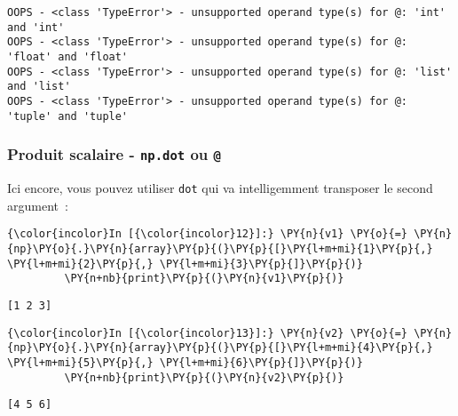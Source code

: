     \begin{Verbatim}[commandchars=\\\{\},frame=single,framerule=0.3mm,rulecolor=\color{cellframecolor}]
OOPS - <class 'TypeError'> - unsupported operand type(s) for @: 'int' and 'int'
OOPS - <class 'TypeError'> - unsupported operand type(s) for @: 'float' and 'float'
OOPS - <class 'TypeError'> - unsupported operand type(s) for @: 'list' and 'list'
OOPS - <class 'TypeError'> - unsupported operand type(s) for @: 'tuple' and 'tuple'
\end{Verbatim}

    \hypertarget{produit-scalaire---np.dot-ou}{%
\subsubsection{\texorpdfstring{Produit scalaire - \texttt{np.dot} ou
\texttt{@}}{Produit scalaire - np.dot ou @}}\label{produit-scalaire---np.dot-ou}}

    Ici encore, vous pouvez utiliser \texttt{dot} qui va intelligemment
transposer le second argument~:

    \begin{Verbatim}[commandchars=\\\{\},frame=single,framerule=0.3mm,rulecolor=\color{cellframecolor}]
{\color{incolor}In [{\color{incolor}12}]:} \PY{n}{v1} \PY{o}{=} \PY{n}{np}\PY{o}{.}\PY{n}{array}\PY{p}{(}\PY{p}{[}\PY{l+m+mi}{1}\PY{p}{,} \PY{l+m+mi}{2}\PY{p}{,} \PY{l+m+mi}{3}\PY{p}{]}\PY{p}{)}
         \PY{n+nb}{print}\PY{p}{(}\PY{n}{v1}\PY{p}{)}
\end{Verbatim}


    \begin{Verbatim}[commandchars=\\\{\},frame=single,framerule=0.3mm,rulecolor=\color{cellframecolor}]
[1 2 3]
\end{Verbatim}

    \begin{Verbatim}[commandchars=\\\{\},frame=single,framerule=0.3mm,rulecolor=\color{cellframecolor}]
{\color{incolor}In [{\color{incolor}13}]:} \PY{n}{v2} \PY{o}{=} \PY{n}{np}\PY{o}{.}\PY{n}{array}\PY{p}{(}\PY{p}{[}\PY{l+m+mi}{4}\PY{p}{,} \PY{l+m+mi}{5}\PY{p}{,} \PY{l+m+mi}{6}\PY{p}{]}\PY{p}{)}
         \PY{n+nb}{print}\PY{p}{(}\PY{n}{v2}\PY{p}{)}
\end{Verbatim}


    \begin{Verbatim}[commandchars=\\\{\},frame=single,framerule=0.3mm,rulecolor=\color{cellframecolor}]
[4 5 6]
\end{Verbatim}

